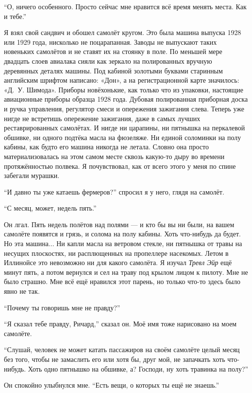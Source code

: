 ``О, ничего особенного. Просто сейчас мне нравится всё время менять места. Как и тебе.''

Я взял свой сандвич и обошел самолёт кругом. Это была машина выпуска 1928 или 1929 года, нисколько не
 поцарапанная. Заводы не выпускают таких новеньких самолётов и не ставят их на стоянку в поле. По
 меньшей мере двадцать слоев авиалака сияли как зеркало на полированных вручную деревянных деталях
 машины. Под кабиной золотыми буквами старинным английским шрифтом написано: «Дон», а на регистрационной
 карте значилось: «Д.~У. Шимода». Приборы новёхонькие, как только что из упаковки, настоящие авиационные приборы образца 1928 года. Дубовая полированная приборная доска и ручка управления, регулятор смеси и опережения зажигания слева. Теперь уже нигде не встретишь опережение зажигания, даже в самых лучших реставрированных самолётах. И нигде ни царапины, ни пятнышка на перкалевой обшивке, ни одного подтёка масла на фюзеляже. Ни единой соломинки на полу кабины, как будто его машина никогда не летала. Словно она просто материализовалась на этом самом месте сквозь какую-то дыру во времени протяжённостью полвека. Я почувствовал, как от всего этого у меня по спине забегали мурашки.

``И давно ты уже катаешь фермеров?'' спросил я у него, глядя на самолёт.

``С месяц, может, недель пять.''

Он лгал. Пять недель полётов над полями --- и кто бы вы ни были, на вашем самолёте появятся и
грязь, и солома на полу кабины. Хоть что-нибудь да будет. Но эта машина... Ни капли масла на
ветровом стекле, ни пятнышка от травы на несущих плоскостях, ни расплющенных на пропеллере
насекомых. Летом в Иллинойсе это невозможно ни для какого самолёта. Я изучал {\it Тревл Эйр\/} ещё
минут пять, а потом вернулся и сел на траву под крылом лицом к пилоту. Мне не было страшно. Мне
всё ещё нравился этот парень, но только что-то здесь было явно не так.

``Почему ты говоришь мне не правду?''

``Я сказал тебе правду, Ричард,'' сказал он. Моё имя тоже нарисовано на моем самолёте.

``Слушай, человек не может катать пассажиров на своём самолёте целый месяц без того, чтобы не замаслить
 его или хотя бы, друг мой, не запачкать хоть что-нибудь. Хоть одно пятнышко на обшивке, а? Господи, ну
 хоть травинка на полу?''

Он спокойно улыбнулся мне. ``Есть вещи, о которых ты ещё не знаешь.''

